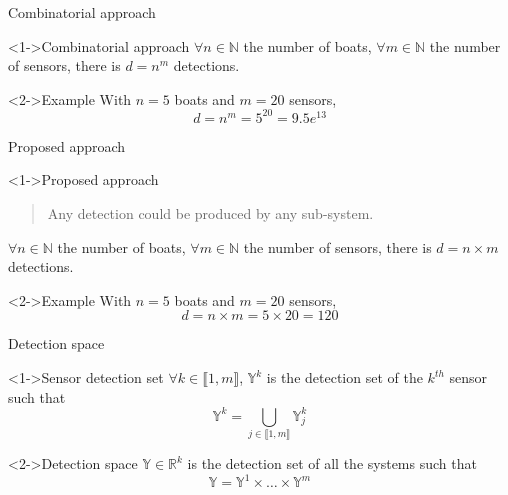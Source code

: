 \documentclass{beamer}
\begin{document}
        \begin{frame}{Combinatorial approach}
            \begin{block}<1->{Combinatorial approach}
                $\forall n \in \mathbb{N}$ the number of boats, $\forall m \in \mathbb{N}$ the number of sensors, there is $d = n^m$ detections.
            \end{block}
            \begin{exampleblock}<2->{Example}
                With $n = 5$ boats and $m = 20$ sensors,
                $$d = n^m = 5^{20} = 9.5e^{13}$$
            \end{exampleblock}
        \end{frame}

        \begin{frame}{Proposed approach}
            \begin{block}<1->{Proposed approach}
                \begin{quote}
                    \centering
                    Any detection could be produced by any sub-system.
                \end{quote}
                $\forall n \in \mathbb{N}$ the number of boats, $\forall m \in \mathbb{N}$ the number of sensors, there is $d = n \times m$ detections.
            \end{block}
            \begin{exampleblock}<2->{Example}
                With $n = 5$ boats and $m = 20$ sensors,
                $$d = n \times m = 5 \times 20 = 120$$
            \end{exampleblock}
        \end{frame}

        \begin{frame}{Detection space}
            \begin{block}<1->{Sensor detection set}
                $\forall k \in \llbracket 1, m\rrbracket$, $\mathbb{Y}^k$ is the detection set of the $k^{th}$ sensor such that
                \begin{equation}
                    \mathbb{Y}^k = \bigcup_{j \in \llbracket 1, m\rrbracket} \mathbb{Y}_j^k
                \end{equation}
            \end{block}
            \begin{block}<2->{Detection space}
                $\mathbb{Y} \in \mathbb{R}^k$ is the detection set of all the systems such that
                \begin{equation}
                    \mathbb{Y} = \mathbb{Y}^1 \times \dots \times \mathbb{Y}^m
                \end{equation}
            \end{block}
        \end{frame}
\end{document}
